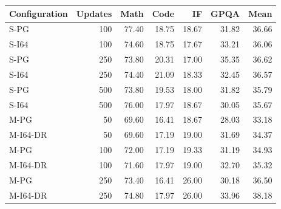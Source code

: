 \begin{tabular}{lrrrrrr}
\toprule
Configuration & Updates & Math & Code & IF & GPQA & Mean \\
\midrule
S-PG & 100 & 77.40 & 18.75 & 18.67 & 31.82 & 36.66 \\
S-I64 & 100 & 74.60 & 18.75 & 17.67 & 33.21 & 36.06 \\
S-PG & 250 & 73.80 & 20.31 & 17.00 & 35.35 & 36.62 \\
S-I64 & 250 & 74.40 & 21.09 & 18.33 & 32.45 & 36.57 \\
S-PG & 500 & 73.80 & 19.53 & 18.00 & 31.82 & 35.79 \\
S-I64 & 500 & 76.00 & 17.97 & 18.67 & 30.05 & 35.67 \\
M-PG & 50 & 69.60 & 16.41 & 18.67 & 28.03 & 33.18 \\
M-I64-DR & 50 & 69.60 & 17.19 & 19.00 & 31.69 & 34.37 \\
M-PG & 100 & 72.00 & 17.19 & 19.33 & 31.19 & 34.93 \\
M-I64-DR & 100 & 71.60 & 17.97 & 19.00 & 32.70 & 35.32 \\
M-PG & 250 & 73.40 & 16.41 & 26.00 & 30.18 & 36.50 \\
M-I64-DR & 250 & 74.80 & 17.97 & 26.00 & 33.96 & 38.18 \\
\bottomrule
\end{tabular}
